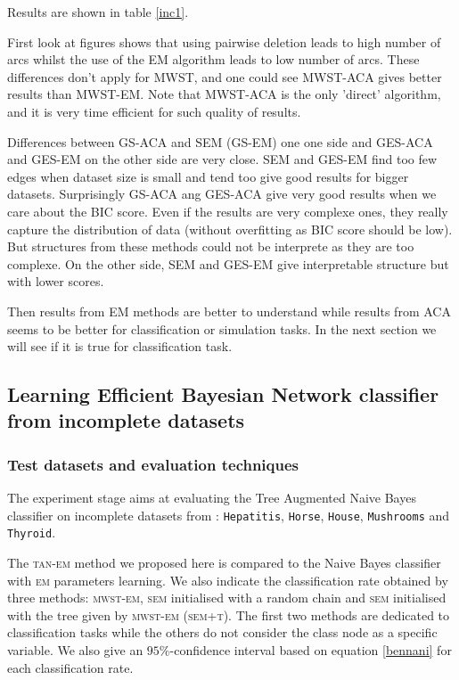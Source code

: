 Results are shown in table \ref{inc1}.

First look at figures shows that using pairwise deletion leads to high number of arcs whilst the use of the EM algorithm leads to low number of arcs.
These differences don't apply for MWST, and one could see MWST-ACA gives better results than MWST-EM.
Note that MWST-ACA is the only 'direct' algorithm, and it is very time efficient for such quality of results.

Differences between GS-ACA and SEM (GS-EM) one one side and GES-ACA and GES-EM on the other side are very close.
SEM and GES-EM find too few edges when dataset size is small and tend too give good results for bigger datasets.
Surprisingly GS-ACA ang GES-ACA give very good results when we care about the BIC score.
Even if the results are very complexe ones, they really capture the distribution of data (without overfitting as BIC score should be low).
But structures from these methods could not be interprete as they are too complexe.
On the other side, SEM and GES-EM give interpretable structure but with lower scores.

Then results from EM methods are better to understand while results from ACA seems to be better for classification or simulation tasks.
In the next section we will see if it is true for classification task.

\subsection{Learning Efficient Bayesian Network classifier from incomplete datasets}

\subsubsection*{Test datasets and evaluation techniques}

The experiment stage aims at evaluating the Tree Augmented Naive Bayes classifier on incomplete datasets from \cite{UCI}: \texttt{Hepatitis}, \texttt{Horse}, \texttt{House}, \texttt{Mushrooms} and \texttt{Thyroid}.

The \textsc{tan-em} method we proposed here is compared to the Naive Bayes classifier with \textsc{em} parameters learning.
We also indicate the classification rate obtained by three methods: \textsc{mwst-em}, \textsc{sem} initialised with a random chain %
and \textsc{sem} initialised with the tree given by \textsc{mwst-em} (\textsc{sem+t}).
The first two methods are dedicated to classification tasks while the others do not consider the class node as a specific variable.
We also give an $95\%$-confidence interval based on equation \ref{bennani} for each classification rate.

